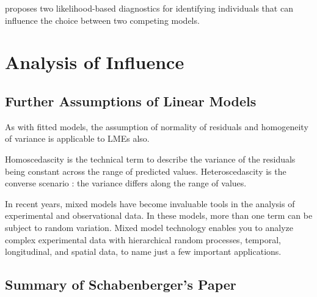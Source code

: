 \documentclass[12pt, a4paper]{article}
\begin{document}
			
			
			\citet{Demi} proposes two likelihood-based diagnostics for identifying individuals that can influence the choice between two competing models.
			
			
			
			\section{Analysis of  Influence}
			
			
			
			\subsection{Further Assumptions of Linear Models}
			
			As with fitted models, the assumption of normality of residuals and homogeneity of variance is applicable to LMEs also. 
			
			
			
			Homoscedascity is the technical term to describe the variance of the
			residuals being constant across the range of predicted values.
			Heteroscedascity is the converse scenario : the variance differs along
			the range of values.
			
			
			
			In recent years, mixed models have become invaluable tools in the analysis of experimental and observational
			data. In these models, more than one term can be subject to random variation. Mixed model
			technology enables you to analyze complex experimental data with hierarchical random processes, temporal,
			longitudinal, and spatial data, to name just a few important applications. 
			
			
			\subsection{Summary of Schabenberger's Paper}
			
\end{document}
